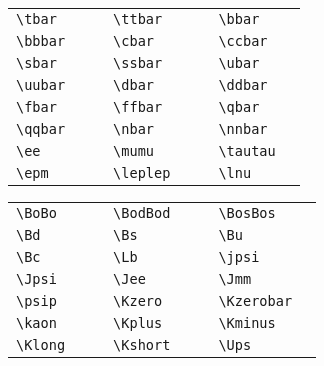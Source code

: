 \documentclass{style/atlasdoc}
\begin{document}
\begin{tabular}{llcllcll}
  \verb+\tbar+ & \tbar{} & \hspace{1cm} &
  \verb+\ttbar+ & \ttbar{} & \hspace{1cm} &
  \verb+\bbar+ & \bbar{} \\
  \verb+\bbbar+ & \bbbar{} & &
  \verb+\cbar+ & \cbar{} & &
  \verb+\ccbar+ & \ccbar{} \\
  \verb+\sbar+ & \sbar{} & &
  \verb+\ssbar+ &  \ssbar{} & &
  \verb+\ubar+ & \ubar{} \\
  \verb+\uubar+ & \uubar{} & &
  \verb+\dbar+ & \dbar{} & &
  \verb+\ddbar+ & \ddbar{} \\
  \verb+\fbar+ & \fbar{} & &
  \verb+\ffbar+ &  \ffbar{} & &
  \verb+\qbar+ & \qbar{} \\
  \verb+\qqbar+ & \qqbar{} & &
  \verb+\nbar+ & \nbar{} & &
  \verb+\nnbar+ & \nnbar{} \\
  \verb+\ee+ & \ee{} & &
  \verb+\mumu+ & \mumu{} & &
  \verb+\tautau+ & \tautau{} \\
  \verb+\epm+ & \epm{} & &
  \verb+\leplep+ & \leplep{} & & 
  \verb+\lnu+ & \lnu{} \\
\end{tabular}

\medskip

\begin{tabular}{llcllcll}
  \verb+\BoBo+ & \BoBo{} & \hspace{1cm} &
  \verb+\BodBod+ & \BodBod{} & \hspace{1cm} &
  \verb+\BosBos+ & \BosBos{} \\
  \verb+\Bd+ & \Bd{} & &
  \verb+\Bs+ & \Bs{} & &
  \verb+\Bu+ & \Bu{} \\
  \verb+\Bc+ & \Bc{} & &
  \verb+\Lb+ & \Lb{} & &
  \verb+\jpsi+ & \jpsi{} \\
  \verb+\Jpsi+ & \Jpsi{} & &
  \verb+\Jee+ & \Jee{} & &
  \verb+\Jmm+ & \Jmm{} \\
  \verb+\psip+ & \psip{} & &
  \verb+\Kzero+ & \Kzero{} & &
  \verb+\Kzerobar+ & \Kzerobar{} \\
  \verb+\kaon+ & \kaon{} & &
  \verb+\Kplus+ & \Kplus{} & &
  \verb+\Kminus+ & \Kminus{} \\
  \verb+\Klong+ & \Klong{} & &
  \verb+\Kshort+ & \Kshort{} & &
  \verb+\Ups+ & \Ups{} \\
\end{tabular}
\end{document}
